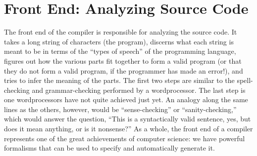 \section{Front End: Analyzing Source Code}\label{background:compilers:front}
The front end of the compiler is responsible for analyzing the source code. It takes a long string of characters (the program), discerns what each string is meant to be in terms of the ``types of speech'' of the programming language, figures out how the various parts fit together to form a valid program (or that they do not form a valid program, if the programmer has made an error!), and tries to infer the meaning of the parts. The first two steps are similar to the spell-checking and grammar-checking performed by a wordprocessor. The last step is one wordprocessors have not quite achieved just yet. An analogy along the same lines as the others, however, would be ``sense-checking'' or ``sanity-checking,'' which would answer the question, ``This is a syntactically valid sentence, yes, but does it mean anything, or is it nonsense?'' As a whole, the front end of a compiler represents one of the great achievements of computer science: we have powerful formalisms that can be used to specify and automatically generate it.



